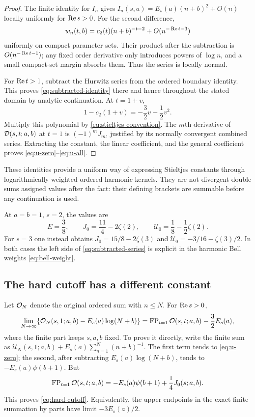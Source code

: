 \begin{proof}
The finite identity for $I_n$ gives
$I_n(s,a)=E_s(a)(n+b)^2+O(n)$ locally uniformly for $\operatorname{Re} s>0$.
For the second difference,
\[
 w_n(t,b)=c_2(t)(n+b)^{-t-2}+O(n^{-\operatorname{Re} t-3})
\]
uniformly on compact parameter sets. Their product after the
subtraction is $O(n^{-\operatorname{Re} t-1})$; any fixed order derivative only
introduces powers of $\log n$, and a small compact-set margin
absorbs them. Thus the series is locally normal.

For $\operatorname{Re} t>1$, subtract the Hurwitz series from the ordered
boundary identity. This proves \eqref{eq:subtracted-identity} there
and hence throughout the stated domain by analytic continuation.
At $t=1+v$,
\[
 1-c_2(1+v)=-\frac32v-\frac12v^2.
\]
Multiply this polynomial by \eqref{eq:stieltjes-convention}.
The $m$th derivative of $\mathcal D(s,t;a,b)$ at $t=1$ is
$(-1)^mJ_m$, justified by its normally convergent combined series.
Extracting the constant, the linear coefficient, and the general
coefficient proves \eqref{eq:u-zero}--\eqref{eq:u-all}.
\end{proof}

These identities provide a uniform way of expressing Stieltjes
constants through logarithmically weighted ordered harmonic kernels.
They are not divergent double sums assigned values after the fact:
their defining brackets are summable before any continuation is used.

\begin{example}
At $a=b=1$, $s=2$, the values are
\[
 E=\frac38,\qquad J_0=\frac{11}{4}-2\zeta(2),\qquad
 \mathcal U_0=\frac18-\frac12\zeta(2).
\]
For $s=3$ one instead obtains
$J_0=15/8-2\zeta(3)$ and
$\mathcal U_0=-3/16-\zeta(3)/2$.
In both cases the left side of \eqref{eq:subtracted-series} is
explicit in the harmonic Bell weights \eqref{eq:bell-weight}.
\end{example}

\subsection{The hard cutoff has a different constant}

Let $\mathcal O_N$ denote the original ordered sum with $n\le N$.
For $\operatorname{Re} s>0$,
\begin{equation}\label{eq:hard-cutoff}
 \lim_{N\to\infty}
 \{\mathcal O_N(s,1;a,b)-E_s(a)\log(N+b)\}
 =\operatorname{FP}_{t=1}\mathcal O(s,t;a,b)-\frac32E_s(a),
\end{equation}
where the finite part keeps $s,a,b$ fixed. To prove it directly,
write the finite sum as
$\mathcal U_N(s,1;a,b)+E_s(a)\sum_{n=1}^N(n+b)^{-1}$.
The first term tends to \eqref{eq:u-zero}; the second, after
subtracting $E_s(a)\log(N+b)$, tends to $-E_s(a)\psi(b+1)$.
But
\begin{equation}\label{eq:fixed-order-fp}
 \operatorname{FP}_{t=1}\mathcal O(s,t;a,b)
 =-E_s(a)\psi(b+1)+\frac14J_0(s;a,b).
\end{equation}
This proves \eqref{eq:hard-cutoff}. Equivalently, the upper endpoints
in the exact finite summation by parts have limit $-3E_s(a)/2$.

